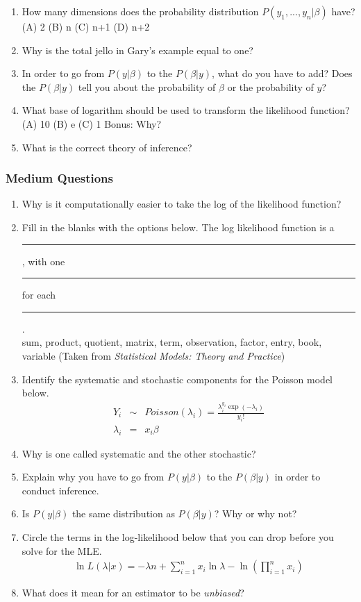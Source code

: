\documentclass[11pt]{article}
\begin{document}
\begin{enumerate}
\begin{center}
\label{fig:nonfloat}
\end{center}
\item How many dimensions does the probability distribution $P(y_1, ..., y_n | \beta)$ have? (A) 2 (B) n (C) n+1 (D) n+2  
\item Why is the total jello in Gary's example equal to one?  
\item In order to go from $P(y|\beta)$ to the $P(\beta|y)$, what do you have to add?  Does the $P(\beta|y)$ tell you about the probability of $\beta$ or the probability of $y$? 
\item What base of logarithm should be used to transform the likelihood function?  (A) 10 (B) e (C) 1  Bonus: Why? 
\item What is the correct theory of inference? 
\end{enumerate}

\subsubsection{Medium Questions}
\begin{enumerate}
\item Why is it computationally easier to take the log of the likelihood function? 
\item Fill in the blanks with the options below.  The log likelihood function is a \rule{10mm}{.1pt}, with one \rule{10mm}{.1pt} for each \rule{10mm}{.1pt}.  \\
sum, product, quotient, matrix, term, observation, factor, entry, book, variable (Taken from \emph{Statistical Models: Theory and Practice}) 
\item Identify the systematic and stochastic components for the Poisson model below.  
\begin{eqnarray*}
Y_i &\sim& Poisson(\lambda_i) = \frac{\lambda_i^{y_i}\exp{(-\lambda_i)}}{y_i!}\\
\lambda_i &=& x_i\beta
\end{eqnarray*}
\item Why is one called systematic and the other stochastic? 
\item Explain why you have to go from $P(y|\beta)$ to the $P(\beta|y)$ in order to conduct inference. 
\item Is $P(y|\beta)$ the same distribution as $P(\beta|y)$?  Why or why not? 
\item Circle the terms in the log-likelihood below that you can drop before you solve for the MLE.
\begin{eqnarray*}
\ln{L(\lambda|x)} = -\lambda n + \sum_{i=1}^n x_i\ln{\lambda} - \ln{(\prod_{i=1}^n x_i)}
\end{eqnarray*} 
\item What does it mean for an estimator to be \emph{unbiased}? 
\end{enumerate}
\end{document}
